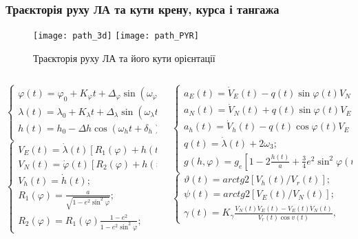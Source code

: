 \documentclass[ucs,compress]{beamer}    %
\begin{document}
\begin{frame}[ shrink=10]
\frametitle{Траєкторія руху ЛА та кути крену, курса і тангажа}
\noindent
\begin{figure}[l]
\noindent\texttt{[image: path\_3d]}
\texttt{[image: path\_PYR]}
\caption{\tiny Траєкторія руху ЛА та його кути орієнтації }
\end{figure}\tiny
\begin{columns}[t]
\begin{column}{4cm}\noindent
$\left \{ \begin{array}{l} 
{\varphi (t)=\varphi_{0}+K_{\varphi } t+\Delta_{\varphi } \sin (\omega_{\varphi } t+\delta_{\varphi } );} \\ 
{\lambda (t)=\lambda_{0}+K_{\lambda } t+\Delta_{\lambda } \sin (\omega_{\lambda } t+\delta_{_{\lambda } } );} \\ 
{h(t)=h_{0} -\Delta h \cos (\omega_{h} t+\delta_{h} );} \\ 
\end{array}\right.$
$\left \{\begin{array}{l}
{V_{E} (t)=\dot{\lambda }(t)\left[R_{1} (\varphi )+h(t)\right]\cos \varphi (t);} \\ 
{V_{N} (t)=\dot{\varphi }(t)[R_{2} (\varphi )+h(t)];} \\ 
{V_{h} (t)=\dot{h}(t);} \\ {R_{1} (\varphi )=\frac{a}{\sqrt{1-e^{2} \sin ^{2} \varphi } } ;} \\ 
{R_{2} (\varphi )=R_{1} (\varphi )\frac{1-e^{2} }{1-e^{2} \sin ^{2} \varphi } ;} 
\end{array} \right.$
\end{column}
\begin{column}{6cm}\noindent
$\left \{\begin{array}{l} 
{a_{E}(t)=\dot{V}_{E} (t)-q(t)\sin \varphi (t)V_{N} (t)+q(t)\cos (t)V_{h} (t);} \\ 
{a_{N}(t)=\dot{V}_{N} (t)+q(t)\sin \varphi (t)V_{E} (t)+\dot{\varphi }(t)V_{h} (t);} \\ 
{a_{h}(t)=\dot{V}_{h} (t)-q(t)\cos \varphi (t)V_{E} (t)-\dot{\varphi }(t)V_{N} (t)+g(h,\varphi);} \\ 
{q(t)=\dot{\lambda }(t)+2\omega_{3} ;} \\ 
{g(h,\varphi)=g_{e} [1-2\frac{h(t)}{a} +\frac{3}{4} e^{2} \sin ^{2} \varphi (t)];} 
\end{array}\right.$
$\left \{\begin{array}{l} 
{\vartheta(t)=arctg2[V_{h} (t)/V_{r} (t)];} \\ 
{\psi (t)=arctg2[V_{E}(t)/V_{N} (t)];} \\ 
{\gamma (t)=K_{\gamma }\frac{V_{N}(t)\dot{V}_{E}(t)-V_{E}(t)\dot{V}_{N}(t)}{V_{r}(t)\cos v(t)},}
 \end{array}\right.$
\end{column}
\end{columns}
\end{frame}
\end{document}
